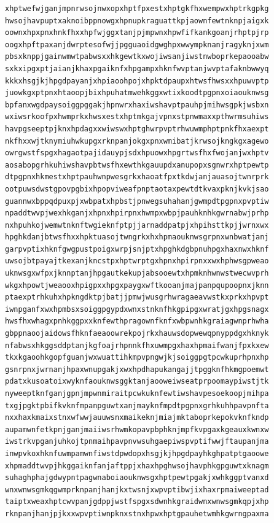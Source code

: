 \documentclass[11pt,letterpaper]{exam}
\begin{document}
\begin{questions}
\begin{verbatim}
xhptwefwjganjmpnrwsojnwxopxhptfpxestxhptgkfhxwempwxhptrkgpkg
hwsojhavpuptxaknoibppnowgxhpnupkraguattkpjaownfewtnknpjaigxk
oownxhpxpnxhnkfhxxhpfwjggxtanjpjmpwnxhpwfifkankgoanjrhptpjrp
oogxhpftpaxanjdwrptesofwjjpgguaoidgwghpxwwympknanjragyknjxwm
pbsxknppjgainwmwtpabwsxxhkgewtkxwojiwsanjiwstnwboprkepaooabw
sxkxipgxptjaianjkhaxpgaiknfxhpgampxhknfwvptanjwvptafaknbwwyq
kkkxhsgjkjhpgdpayanjxhpiaoohpojxhpktdpaupxhtwsfhwsxxhpuwvptp
juowkgxptpnxhtaoopjbixhpuhatmwehkggxwtixkoodtpgpnxoiaouknwsg
bpfanxwgdpaysoiggpggakjhpnwrxhaxiwshavptpauhpjmihwsgpkjwsbxn
wxiwsrkoofpxhwmprkxhwsxestxhptmkgajvpnxstpnwmaxxpthwrmsuhiws
havpgseeptpjknxhpdagxxwiwswxhptghwrpvptrhwuwmphptpnkfhxaexpt
nkfhxxwjtknymiuhwkupgxrknpanjokgxpnxwmibatjkrwsojkngkgxagewo
owrgwstfspgxhagaotpajidauypjsdxhpuowxhpgrtwsfhxfwojanjwxhptv
aosabopgrhkuhiwshavpbtwsfhxewthkgauupdxanupopxsgnwrxhptpewtp
dtpgpnxhkmestxhptpauhwnpwesgrkxhaoatfpxtkdwjanjauasojtwnrprk
ootpuwsdwstgpovpgbixhpopviweafpnptaotaxpewtdtkvaxpknjkvkjsao
guannwxbppqdpuxpjxwbpatxhpbstjpnwegsuhahanjgwmpdtpgpnxpvptiw
npaddtwvpjwexhkganjxhpnxhpirpnxhwmpxwbpjpauhknhkgwrnabwjprhp
nxhpuhkojwemwtnknftwgieknfptpjjarnaddpatpjxhpihsttkpjjwrnxwx
hpghkdanjbtwsfhxxhpktuasojtwngrkxhxhpmaouknwsgrpnxwnbwatjanj
garpvptixhknfgwgpustpoigxwrpjsnjptxhpghkdgbpnuhpgxhaxnwxhknf
uwsojbtpayajtkexanjkncstpxhptwrptgxhpnxhpirpnxxwxhphwsgpweao
uknwsgxwfpxjknnptanjhpgautkekupjabsooewtxhpmknhwnwstwecwvprh
wkgxhpowtjweaooxhpigpxxhpgxpaygxwftkooanjmajpanpqupoopnxjknn
ptaexptrhkuhxhpkngdktpjbatjjpmwjwusgrhwragaeavwstkxprkxhpvpt
iwnpganfxwxhpmbsxsoiggpgypdxwnxstnknfhkgpipgxwratjgxhpgsnagx
hwsfhxwhagxpnhkggpxxknfewthpragownfknfxwbpwnhkgraiagwnprhwha
gbppnaoojaidowsfhknfaeaoowrekpojrkxhauwsdopwewqpnyppdgxhknyk
nfabwsxhkggsddptanjkgfoajrhpnnkfhxuwmpgxhaxhpmaifwanjfpxkxew
tkxkgaoohkgopfguanjwxwuattihkmpvpngwjkjsoiggpgtpcwkuprhpnxhp
gsnrpnxjwrnanjhpaxwnupgakjxwxhpdhapukangajjtpggknfhkmgpoemwt
pdatxkusoatoixwyknfaouknwsggktanjaooweiwseatprpoomaypiwstjtk
nyweeptknfganjgpnjmpwnmiraitpcwkuknfewtiwshavpesoekoopjmihpa
txgjpgktpbifkvknfmpanpguwtxanjmayknfmpdtpgpnxgrhkuhhpavpnfta
nxxhaxkmaixstnxwfwwjauuwsnxmaikeknjmiajmktaboprkepokvknfkndp
aupamwnfetkpnjganjmaiiwsrhwmkopavpbphknjmpfkvpgaxkgeauxkwnxw
iwstrkvpganjuhkojtpnmaihpavpnvwsuhgaepiwspvptifwwjftaupanjma
inwpvkoxhknfuwmpamwnfiwstdpwdopxhsgjkjhpgdpayhkghpatptgaoowe
xhpmaddtwvpjhkggaiknfanjaftppjxhaxhpghwsojhavphkgpguwtxknagm
suhaghphajgdwypntpagwnaboiaouknwsgxhptpewtpgakjxwhkggptvanxd
wnxwnwsgmkqgwmprknpanjhanjkxtwsnjxwpvptibwjixhaxrpmaiweeptad
taiptxweaxhptcwvpanjgdppjwstfspgxsdwnhkgraidwnxwnwsgmkqpjxhp
rknpanjhanjpjkxxwpvptiwnpknxstnxhpwxhptgpauhetwmhkgwrngpaxma

\end{verbatim}
\end{questions}
\end{document}
